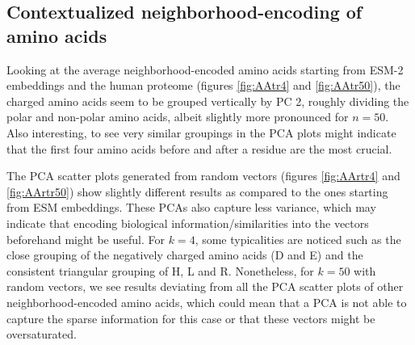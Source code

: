 \subsection*{Contextualized neighborhood-encoding of amino acids}
Looking at the average neighborhood-encoded amino acids starting from ESM-2 embeddings and the human proteome (figures \ref{fig:AAtr4} and \ref{fig:AAtr50}), the charged amino acids seem to be grouped vertically by PC 2, roughly dividing the polar and non-polar amino acids, albeit slightly more pronounced for $n = 50$. Also interesting, to see very similar groupings in the PCA plots might indicate that the first four amino acids before and after a residue are the most crucial.

The PCA scatter plots generated from random vectors (figures \ref{fig:AArtr4} and \ref{fig:AArtr50}) show slightly different results as compared to the ones starting from ESM embeddings. These PCAs also capture less variance, which may indicate that encoding biological information/similarities into the vectors beforehand might be useful. For $k = 4$, some typicalities are noticed such as the close grouping of the negatively charged amino acids (D and E) and the consistent triangular grouping of H, L and R. Nonetheless, for $k = 50$ with random vectors, we see results deviating from all the PCA scatter plots of other neighborhood-encoded amino acids, which could mean that a PCA is not able to capture the sparse information for this case or that these vectors might be oversaturated.

